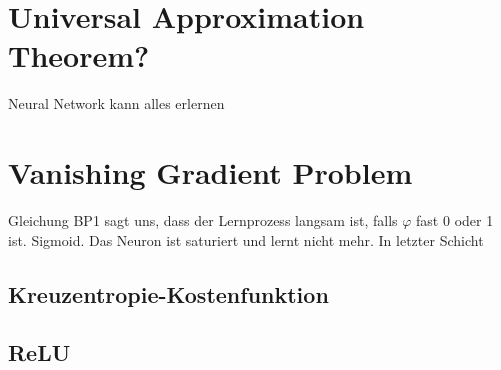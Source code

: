 \cite{Nielsen}


\section{Universal Approximation Theorem?}\label{sec:UAT}
Neural Network kann alles erlernen

\section{Vanishing Gradient Problem}

Gleichung BP1 sagt uns, dass der Lernprozess langsam ist, falls $\varphi$ fast 0
oder 1 ist. Sigmoid. Das Neuron ist saturiert und lernt nicht mehr. In letzter Schicht

\subsection{Kreuzentropie-Kostenfunktion}

\subsection{ReLU}

\pagebreak

